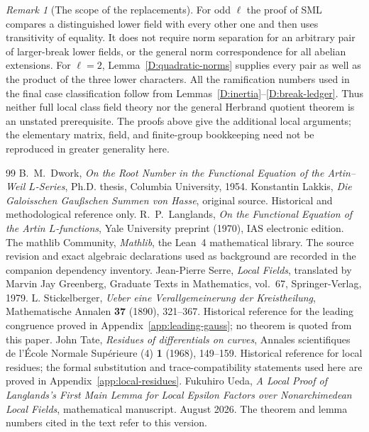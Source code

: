 \documentclass[11pt]{amsart}
\theoremstyle{definition}
\theoremstyle{remark}
\newtheorem{remark}[theorem]{Remark}
\begin{document}
\begin{remark}[The scope of the replacements]\label{D:scope}
For odd $\ell$ the proof of SML compares a distinguished lower field
with every other one and then uses transitivity of equality. It does
not require norm separation for an arbitrary pair of larger-break
lower fields, or the general norm correspondence for all abelian
extensions. For $\ell=2$, Lemma~\ref{D:quadratic-norms} supplies every
pair as well as the product of the three lower characters. All the
ramification numbers used in the final case classification follow
from Lemmas~\ref{D:inertia}--\ref{D:break-ledger}. Thus neither full
local class field theory nor the general Herbrand quotient theorem is
an unstated prerequisite. The proofs above give the additional
local arguments; the elementary matrix, field, and finite-group
bookkeeping need not be reproduced in greater generality here.
\end{remark}


\begin{thebibliography}{99}
 B.~M.~Dwork,
\emph{On the Root Number in the Functional Equation of the Artin--Weil
$L$-Series}, Ph.D. thesis, Columbia University, 1954.
 Konstantin Lakkis,
\emph{Die Galoisschen Gau{\ss}schen Summen von Hasse}, original source.
Historical and methodological reference only.
 R.~P.~Langlands,
\emph{On the Functional Equation of the Artin $L$-functions},
Yale University preprint (1970), IAS electronic edition.
 The mathlib Community, \emph{Mathlib}, the Lean~4 mathematical
library. The source revision and exact algebraic declarations used as
background are recorded in the companion dependency inventory.
 Jean-Pierre Serre, \emph{Local Fields}, translated by
Marvin Jay Greenberg, Graduate Texts in Mathematics, vol.~67,
Springer-Verlag, 1979.
 L. Stickelberger,
\emph{Ueber eine Verallgemeinerung der Kreistheilung},
Mathematische Annalen \textbf{37} (1890), 321--367.
Historical reference for the leading congruence proved in
Appendix~\ref{app:leading-gauss}; no theorem is quoted from this paper.
 John Tate, \emph{Residues of differentials on curves},
Annales scientifiques de l'\'Ecole Normale Sup\'erieure (4)
\textbf{1} (1968), 149--159. Historical reference for local residues;
the formal substitution and trace-compatibility statements used here
are proved in Appendix~\ref{app:local-residues}.
 Fukuhiro Ueda,
\emph{A Local Proof of Langlands's First Main Lemma for Local Epsilon
Factors over Nonarchimedean Local Fields}, mathematical manuscript.
August 2026. The theorem and lemma numbers cited in the text refer to
this version.
\end{thebibliography}
\end{document}
